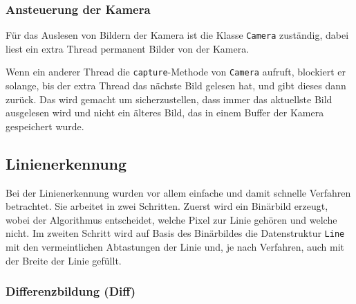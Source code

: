 \documentclass[ngerman,a4paper,parskip=half]{scrartcl}
\begin{document}
\subsubsection{Ansteuerung der Kamera}

Für das Auslesen von Bildern der Kamera ist die Klasse \texttt{Camera} zuständig, dabei liest ein extra Thread permanent Bilder von der Kamera.

Wenn ein anderer Thread die \texttt{capture}-Methode von \texttt{Camera} aufruft, blockiert er solange, bis der extra Thread das nächste Bild gelesen hat, und gibt dieses dann zurück. Das wird gemacht um sicherzustellen, dass immer das aktuellste Bild ausgelesen wird und nicht ein älteres Bild, das in einem Buffer der Kamera gespeichert wurde.


\subsection{Linienerkennung}

Bei der Linienerkennung wurden vor allem einfache und damit schnelle Verfahren betrachtet. Sie arbeitet in zwei Schritten. Zuerst wird ein Binärbild erzeugt, wobei der Algorithmus entscheidet, welche Pixel zur Linie gehören und welche nicht. Im zweiten Schritt wird auf Basis des Binärbildes die Datenstruktur \texttt{Line} mit den vermeintlichen Abtastungen der Linie und, je nach Verfahren, auch mit der Breite der Linie gefüllt.

\subsubsection{Differenzbildung (Diff)}
\end{document}
